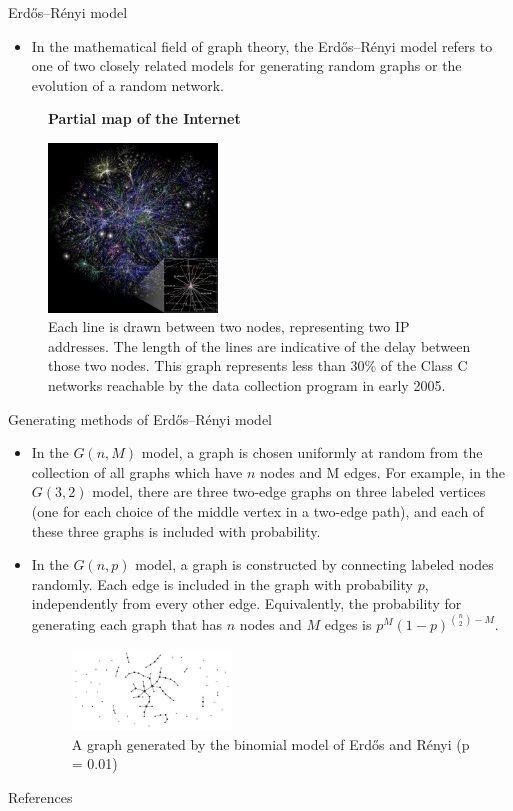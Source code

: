 \documentclass[notheorems, aspectratio=54]{beamer}
\begin{document}
\begin{frame}{Erdős–Rényi model}
  \begin{itemize}
    \item In the mathematical field of graph theory, the Erdős–Rényi model refers to one of two closely related models for generating random graphs or the evolution of a random network.
  \end{itemize}
  \begin{figure}
    \centering
    \textbf{Partial map of the Internet}\par\medskip
    \includegraphics[width=0.4\textwidth]{internet_map.jpg}
      \caption{Each line is drawn between two nodes, representing two IP addresses. The length of the lines are indicative of the delay between those two nodes. This graph represents less than 30\% of the Class C networks reachable by the data collection program in early 2005.}
  \end{figure}
\end{frame}

\begin{frame}{Generating methods of Erdős–Rényi model}
  \begin{itemize}
    \item In the $G(n, M)$ model, a graph is chosen uniformly at random from the collection of all graphs which have $n$ nodes and M edges. For example, in the $G(3,2)$ model, there are three two-edge graphs on three labeled vertices (one for each choice of the middle vertex in a two-edge path), and each of these three graphs is included with probability.
    \item In the $G(n, p)$ model, a graph is constructed by connecting labeled nodes randomly. Each edge is included in the graph with probability $p$, independently from every other edge. Equivalently, the probability for generating each graph that has $n$ nodes and $M$ edges is ${\displaystyle p^{M}(1-p)^{{n \choose 2}-M}}$.
  \begin{figure}
    \centering
    \includegraphics[width=0.4\textwidth]{er_example.jpg}
      \caption{A graph generated by the binomial model of Erdős and Rényi (p = 0.01)}
  \end{figure}
  \end{itemize}
\end{frame}

\begin{frame}{References}
    \printbibliography
\end{frame}
\end{document}
